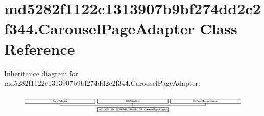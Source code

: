 \hypertarget{classmd5282f1122c1313907b9bf274dd2c2f344_1_1CarouselPageAdapter}{}\section{md5282f1122c1313907b9bf274dd2c2f344.\+Carousel\+Page\+Adapter Class Reference}
\label{classmd5282f1122c1313907b9bf274dd2c2f344_1_1CarouselPageAdapter}
Inheritance diagram for md5282f1122c1313907b9bf274dd2c2f344.\+Carousel\+Page\+Adapter\+:\begin{figure}[H]
\begin{center}
\leavevmode
\includegraphics[height=0.964686cm]{classmd5282f1122c1313907b9bf274dd2c2f344_1_1CarouselPageAdapter}
\end{center}
\end{figure}
